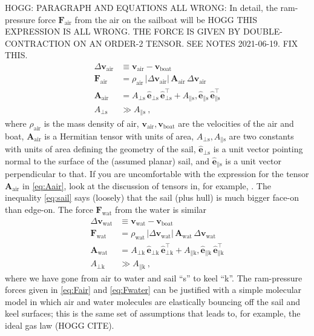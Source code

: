 \documentclass{article}
\renewcommand{\vec}[1]{\boldsymbol{#1}}
\newcommand{\uvec}{\vec{\hat{e}}}
\newcommand{\tensor}[1]{\mathbf{#1}}
\newcommand{\air}{\text{air}}
\newcommand{\water}{\text{wat}}
\newcommand{\boat}{\text{boat}}
\newcommand{\sail}{\text{s}}
\newcommand{\keel}{\text{k}}
\newcommand{\vair}{\vec{v}_\air}
\newcommand{\vwater}{\vec{v}_\water}
\newcommand{\vboat}{\vec{v}_\boat}
\begin{document}
HOGG: PARAGRAPH AND EQUATIONS ALL WRONG: In detail, the ram-pressure force $\vec{F}_\air$ from the air on the sailboat will be
HOGG THIS EXPRESSION IS ALL WRONG. THE FORCE IS GIVEN BY DOUBLE-CONTRACTION ON AN ORDER-2 TENSOR. SEE NOTES 2021-06-19. FIX THIS.
\begin{align}
    \Delta\vair &\equiv \vair-\vboat
    \\
    \vec{F}_\air &= \rho_\air\,|\Delta\vair|\,\tensor{A}_\air\,\Delta\vair \label{eq:Fair}
    \\
    \tensor{A}_\air &= A_{\perp\sail}\,\uvec_{\perp\sail}\,\uvec_{\perp\sail}^\top + A_{\parallel\sail},\uvec_{\parallel\sail}\,\uvec_{\parallel\sail}^\top \label{eq:Aair}
    \\
    A_{\perp\sail} &\gg A_{\parallel\sail} \label{eq:sail}
    ~,
\end{align}
where $\rho_\air$ is the mass density of air, $\vair,\vboat$ are the velocities of the air and boat, $\tensor{A}_\air$ is a Hermitian tensor with units of area, $A_{\perp\sail}, A_{\parallel\sail}$ are two constants with units of area defining the geometry of the sail, $\uvec_{\perp\sail}$ is a unit vector pointing normal to the surface of the (assumed planar) sail, and $\uvec_{\parallel\sail}$ is a unit vector perpendicular to that.
If you are uncomfortable with the expression for the tensor $\tensor{A}_\air$ in \eqref{eq:Aair}, look at the discussion of tensors in, for example, \cite{kusse}.
The inequality \eqref{eq:sail} says (loosely) that the sail (plus hull) is much bigger face-on than edge-on.
The force $\vec{F}_\water$ from the water is similar
\begin{align}
    \Delta\vwater &\equiv \vwater-\vboat
    \\
    \vec{F}_\water &= \rho_\water\,|\Delta\vwater|\,\tensor{A}_\water\,\Delta\vwater \label{eq:Fwater}
    \\
    \tensor{A}_\water &= A_{\perp\keel}\,\uvec_{\perp\keel}\,\uvec_{\perp\keel}^\top + A_{\parallel\keel},\uvec_{\parallel\keel}\,\uvec_{\parallel\keel}^\top
    \\
    A_{\perp\keel} &\gg A_{\parallel\keel} ~,
\end{align}
where we have gone from air to water and sail ``s'' to keel ``k''.
The ram-pressure forces given in \eqref{eq:Fair} and \eqref{eq:Fwater} can be justified with a simple molecular model in which air and water molecules are elastically bouncing off the sail and keel surfaces; this is the same set of assumptions that leads to, for example, the ideal gas law (HOGG CITE).
\end{document}
